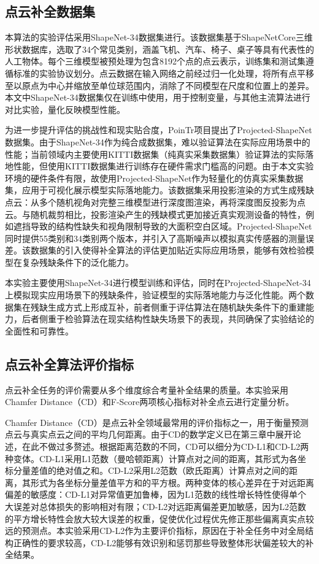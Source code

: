 \subsection{点云补全数据集}

本算法的实验评估采用ShapeNet-34数据集进行。该数据集基于ShapeNetCore三维形状数据库，选取了34个常见类别，涵盖飞机、汽车、椅子、桌子等具有代表性的人工物体。每个三维模型被预处理为包含8192个点的点云表示，训练集和测试集遵循标准的实验协议划分。点云数据在输入网络之前经过归一化处理，将所有点平移至以原点为中心并缩放至单位球范围内，消除了不同模型在尺度和位置上的差异。本文中ShapeNet-34数据集仅在训练中使用，用于控制变量，与其他主流算法进行对比实验，量化反映模型性能。

为进一步提升评估的挑战性和现实贴合度，PoinTr项目提出了Projected-ShapeNet数据集。由于ShapeNet-34作为纯合成数据集，难以验证算法在实际应用场景中的性能；当前领域内主要使用KITTI数据集（纯真实采集数据集）验证算法的实际落地性能，但使用KITTI数据集进行训练存在硬件需求门槛高的问题。由于本文实验环境的硬件条件有限，故使用Projected-ShapeNet作为轻量化的仿真实采集数据集，应用于可视化展示模型实际落地能力。该数据集采用投影渲染的方式生成残缺点云：从多个随机视角对完整三维模型进行深度图渲染，再将深度图反投影为点云。与随机裁剪相比，投影渲染产生的残缺模式更加接近真实观测设备的特性，例如遮挡导致的结构性缺失和视角限制导致的大面积空白区域。Projected-ShapeNet同时提供55类别和34类别两个版本，并引入了高斯噪声以模拟真实传感器的测量误差。该数据集的引入使得补全算法的评估更加贴近实际应用场景，能够有效检验模型在复杂残缺条件下的泛化能力。

本实验主要使用ShapeNet-34进行模型训练和评估，同时在Projected-ShapeNet-34上模拟现实应用场景下的残缺条件，验证模型的实际落地能力与泛化性能。两个数据集在残缺生成方式上形成互补，前者侧重于评估算法在随机缺失条件下的重建能力，后者侧重于检验算法在现实结构性缺失场景下的表现，共同确保了实验结论的全面性和可靠性。

\subsection{点云补全算法评价指标}

点云补全任务的评价需要从多个维度综合考量补全结果的质量。本实验采用Chamfer Distance（CD）和F-Score两项核心指标对补全点云进行定量分析。

Chamfer Distance（CD）是点云补全领域最常用的评价指标之一，用于衡量预测点云与真实点云之间的平均几何距离。由于CD的数学定义已在第三章中展开论述，在此不做过多赘述。根据距离范数的不同，CD可以细分为CD-L1和CD-L2两种变体。CD-L1采用L1范数（曼哈顿距离）计算点对之间的距离，其形式为各坐标分量差值的绝对值之和。CD-L2采用L2范数（欧氏距离）计算点对之间的距离，其形式为各坐标分量差值平方和的平方根。两种变体的核心差异在于对远距离偏差的敏感度：CD-L1对异常值更加鲁棒，因为L1范数的线性增长特性使得单个大误差对总体损失的影响相对有限；CD-L2对远距离偏差更加敏感，因为L2范数的平方增长特性会放大较大误差的权重，促使优化过程优先修正那些偏离真实点较远的预测点。本实验采用CD-L2作为主要评价指标，原因在于补全任务中对全局结构正确性的要求较高，CD-L2能够有效识别和惩罚那些导致整体形状偏差较大的补全结果。

